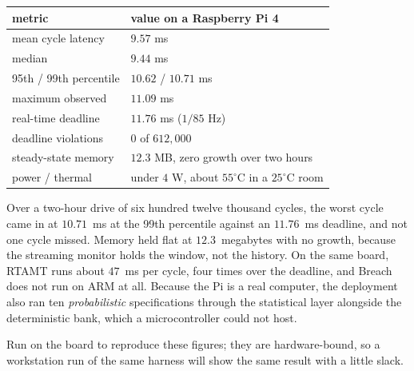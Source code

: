 \begin{table}[h]
\centering\small
\renewcommand{\arraystretch}{1.25}
\begin{widefig}\begin{tabular}{@{}l l@{}}
\toprule
\textbf{metric} & \textbf{value on a Raspberry Pi 4}\\
\midrule
mean cycle latency & $9.57$ ms\\
median & $9.44$ ms\\
95th / 99th percentile & $10.62$ / $10.71$ ms\\
maximum observed & $11.09$ ms\\
real-time deadline & $11.76$ ms ($1/85$ Hz)\\
deadline violations & $0$ of $612{,}000$\\
steady-state memory & $12.3$ MB, zero growth over two hours\\
power / thermal & under $4$ W, about $55^{\circ}$C in a $25^{\circ}$C room\\
\bottomrule
\end{tabular}\end{widefig}
\end{table}

Over a two-hour drive of six hundred twelve thousand cycles, the worst cycle came in at $10.71$~ms at the 99th percentile against an $11.76$~ms deadline, and not one cycle missed. Memory held flat at $12.3$~megabytes with no growth, because the streaming monitor holds the window, not the history. On the same board, RTAMT runs about $47$~ms per cycle, four times over the deadline, and Breach does not run on ARM at all. Because the Pi is a real computer, the deployment also ran ten \emph{probabilistic} specifications through the statistical layer alongside the deterministic bank, which a microcontroller could not host.

\begin{notebox}
Run  on the board to reproduce these figures; they are hardware-bound, so a workstation run of the same harness will show the same result with a little slack.
\end{notebox}